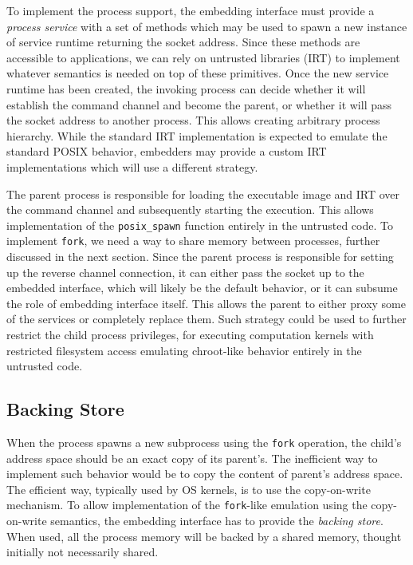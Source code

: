 
To implement the process support, the embedding interface must provide a
\emph{process service} with a set of methods which may be used to spawn
a new instance of service runtime returning the socket address. Since
these methods are accessible to applications, we can rely on untrusted
libraries (\ie IRT) to implement whatever semantics is needed on top of
these primitives. Once the new service runtime has been created, the
invoking process can decide whether it will establish the command
channel and become the parent, or whether it will pass the socket
address to another process.  This allows creating arbitrary process
hierarchy.  While the standard IRT implementation is expected to emulate
the standard POSIX behavior, embedders may provide a custom IRT
implementations which will use a different strategy.

The parent process is responsible for loading the executable image and
IRT over the command channel and subsequently starting the execution.
This allows implementation of the \lstinline`posix_spawn` function
entirely in the untrusted code. To implement \lstinline`fork`, we need a
way to share memory between processes, further discussed in the next
section.  Since the parent process is responsible for setting up the
reverse channel connection, it can either pass the socket up to the
embedded interface, which will likely be the default behavior, or it can
subsume the role of embedding interface itself. This allows the parent
to either proxy some of the services or completely replace them. Such
strategy could be used to further restrict the child process privileges,
\eg for executing computation kernels with restricted filesystem access
emulating chroot-like behavior entirely in the untrusted code.

\subsection{Backing Store}
\label{sub:backing_store}


When the process spawns a new subprocess using the \lstinline`fork`
operation, the child's address space should be an exact copy of its
parent's.  The inefficient way to implement such behavior would be to
copy the content of parent's address space. The efficient way, typically
used by OS kernels, is to use the copy-on-write mechanism.  To allow
implementation of the \lstinline`fork`-like emulation using the
copy-on-write semantics, the embedding interface has to provide the
\emph{backing store}. When used, all the process memory will be backed
by a shared memory, thought initially not necessarily shared.


